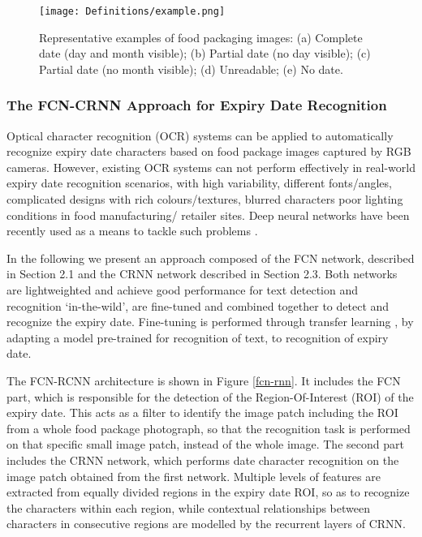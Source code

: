 \documentclass[journal,article,accept,moreauthors,pdftex]{Definitions/mdpi}
\begin{document}
\begin{figure*}[tph!]
\texttt{[image: Definitions/example.png]}
\centering
\caption{Representative examples of food packaging images: (a) Complete date (day and month visible); (b) Partial date (no day visible); (c) Partial date (no month visible); (d) Unreadable; (e) No date.}
\label{dataset}
\end{figure*}

\subsubsection{The FCN-CRNN Approach for Expiry Date Recognition}

Optical character
recognition (OCR) systems \cite{ref34, ref49} can be applied to automatically
recognize expiry date characters based on food package images captured by RGB cameras. However, existing OCR systems can not perform effectively in
real-world expiry date recognition scenarios, with high variability, different fonts/angles, complicated 
designs with rich colours/textures, blurred
characters poor lighting conditions in food manufacturing/
retailer sites. Deep neural networks have been recently used as a means to tackle such problems \cite{ref76, ref77}.


In the following we present an approach composed of the FCN network, described in Section 2.1 and the CRNN network described in Section 2.3. Both networks are lightweighted and
achieve good performance for text detection and recognition
‘in-the-wild’, are fine-tuned and combined together to
detect and recognize the expiry date. Fine-tuning is performed through transfer learning  \cite{ref35}, by adapting a model pre-trained for
recognition of text, to recognition of expiry date.

The FCN-RCNN architecture is shown in Figure \ref{fcn-rnn}. 
It includes the FCN part,
which is responsible for the detection of the Region-Of-Interest (ROI) of the expiry
date. This acts as a filter to identify the image patch including the ROI
from a whole food package photograph, so that
the recognition task is performed on that
specific small image patch, instead of the whole image.
The second part includes the CRNN network, which
performs date character recognition on the image
patch obtained from the first network. Multiple levels of features
are extracted from equally divided regions in the expiry date ROI, so as to recognize the characters within each region,
while contextual relationships between characters in consecutive
regions are modelled by the
recurrent layers of CRNN.
\end{document}
